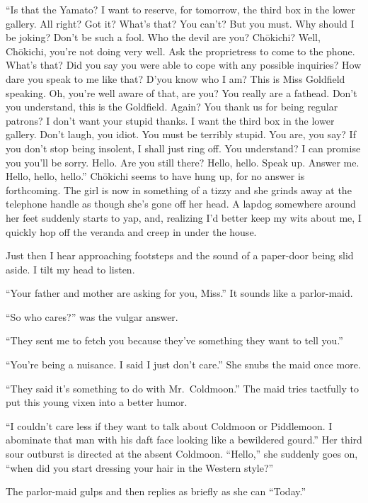 \documentclass{book}
\begin{document}
``Is that the Yamato? I want to reserve, for tomorrow, the third box in
the lower gallery. All right? Got it? What's that? You can't? But you
must. Why should I be joking? Don't be such a fool. Who the devil are
you? Chōkichi? Well, Chōkichi, you're not doing very well. Ask the
proprietress to come to the phone. What's that? Did you say you were
able to cope with any possible inquiries? How dare you speak to me like
that? D'you know who I am? This is Miss Goldfield speaking. Oh, you're
well aware of that, are you? You really are a fathead. Don't you
understand, this is the Goldfield. Again? You thank us for being regular
patrons? I don't want your stupid thanks. I want the third box in the
lower gallery. Don't laugh, you idiot. You must be terribly stupid. You
are, you say? If you don't stop being insolent, I shall just ring off.
You understand? I can promise you you'll be sorry. Hello. Are you still
there? Hello, hello. Speak up. Answer me. Hello, hello, hello.''
Chōkichi seems to have hung up, for no answer is forthcoming. The girl
is now in something of a tizzy and she grinds away at the telephone
handle as though she's gone off her head. A lapdog somewhere around her
feet suddenly starts to yap, and, realizing I'd better keep my wits
about me, I quickly hop off the veranda and creep in under the house.

Just then I hear approaching footsteps and the sound of a paper-door
being slid aside. I tilt my head to listen.

``Your father and mother are asking for you, Miss.'' It sounds like a
parlor-maid.

``So who cares?'' was the vulgar answer.

``They sent me to fetch you because they've something they want to tell
you.''

``You're being a nuisance. I said I just don't care.'' She snubs the
maid once more.

``They said it's something to do with Mr.~Coldmoon.'' The maid tries
tactfully to put this young vixen into a better humor.

``I couldn't care less if they want to talk about Coldmoon or
Piddlemoon. I abominate that man with his daft face looking like a
bewildered gourd.'' Her third sour outburst is directed at the absent
Coldmoon. ``Hello,'' she suddenly goes on, ``when did you start dressing
your hair in the Western style?''

The parlor-maid gulps and then replies as briefly as she can ``Today.''
\end{document}
